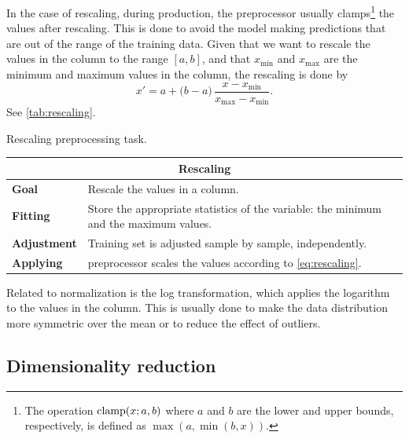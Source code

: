 In the case of rescaling, during production, the \gls{preprocessor} usually clamps\footnote{The
operation $\operatorname{clamp}(x; a, b)$ where $a$ and $b$ are the lower and upper bounds,
respectively, is defined as $\max(a, \min(b, x))$.} the values after rescaling.  This is
done to avoid the model making predictions that are out of the range of the training
data.  Given that we want to rescale the values in the column to the range $[a, b]$, and
that $x_\text{min}$ and $x_\text{max}$ are the minimum and maximum values in the column,
the rescaling is done by
\begin{equation}
  \label{eq:rescaling}
  x' = a + \big(b - a\big) \, \frac{x - x_\text{min}}{x_\text{max} - x_\text{min}}\text{.}
\end{equation}
See \cref{tab:rescaling}.

\begin{tablebox}[label=tab:rescaling]{Rescaling preprocessing task.}
  \centering
  \begin{tabular}{lp{6cm}}
    \toprule
    \multicolumn{2}{c}{\textbf{Rescaling}} \\
    \midrule
    \textbf{Goal} &
      Rescale the values in a column. \\
    \textbf{Fitting} &
      Store the appropriate statistics of the variable: the minimum and the maximum
      values. \\
    \textbf{Adjustment} &
      Training set is adjusted sample by sample, independently. \\
    \textbf{Applying} &
      \Gls{preprocessor} scales the values according to \cref{eq:rescaling}. \\
    \bottomrule
  \end{tabular}
\end{tablebox}

Related to normalization is the log transformation, which applies the logarithm to the
values in the column.  This is usually done to make the data distribution more symmetric
over the mean or to reduce the effect of outliers.


\subsection{Dimensionality reduction}

